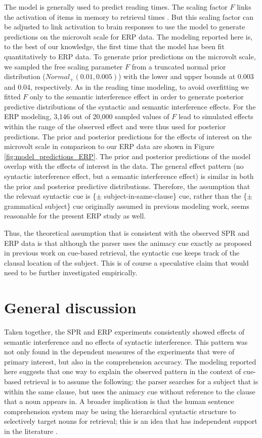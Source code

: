 \documentclass[a4paper, man, floatsintext]{apa7}
\begin{document}
The \citet{Lewis2005} model is generally used to predict reading times. The scaling factor $F$ links the activation of items in memory to retrieval times \citep{Lewis2005,anderson_etal_2004_ACT_R}. But this scaling factor can be adjusted to link activation to brain responses to use the model to generate predictions on the microvolt scale for ERP data. The modeling reported here is, to the best of our knowledge, the first time that the \citet{Lewis2005} model has been fit quantitatively to ERP data. To generate prior predictions on the microvolt scale, we sampled the free scaling parameter $F$ from a truncated normal prior distribution ($Normal_+(0.01, 0.005)$) with the lower and upper bounds at 0.003 and 0.04, respectively. As in the reading time modeling, to avoid overfitting we fitted $F$ only to the semantic interference effect in order to generate posterior predictive distributions of the syntactic and semantic interference effects. For the ERP modeling, 3,146 out of 20,000 sampled values of $F$ lead to simulated effects within the range of the observed effect and were thus used for posterior predictions. The prior and posterior predictions for the effects of interest on the microvolt scale in comparison to our ERP data are shown in Figure \ref{fig:model_predictions_ERP}. The prior and posterior predictions of the model overlap with the effects of interest in the data. The general effect pattern (no syntactic interference effect, but a semantic interference effect) is similar in both the prior and posterior predictive distributions. Therefore, the assumption that the relevant syntactic cue is \{$\pm$ subject-in-same-clause\} cue, rather than  the \{$\pm$ grammatical subject\} cue originally assumed in previous modeling work, seems reasonable for the present ERP study as well.

Thus, the theoretical assumption that is consistent with the observed SPR and ERP data is that although the parser uses the animacy cue exactly as proposed in previous work on cue-based retrieval, the syntactic cue keeps track of the clausal location of the subject. This is of course a speculative claim that would need to be further investigated empirically. 

\section{General discussion}

Taken together, the SPR and ERP experiments consistently showed effects of semantic interference and no effects of syntactic interference. This pattern was not only found in the dependent measures of the experiments that were of primary interest, but also in the comprehension accuracy. 
The modeling reported here suggests that one way to explain the observed pattern in the context of cue-based retrieval is to assume the following: the parser searches for a subject that is within the same clause, but uses the animacy cue without reference to the clause that a noun appears in. A broader implication is that the human sentence comprehension system may be using the hierarchical syntactic structure to selectively target nouns for retrieval; this is an idea that has independent support in the literature \citep[e.g.,][]{Sturt2003,dillon2013}.
\end{document}
